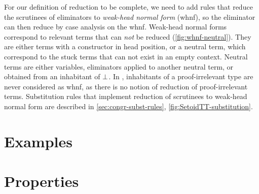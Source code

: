 For our definition of reduction to be complete, we need to add rules that
reduce the scrutinees of eliminators to {\em weak-head normal form} (whnf),
so the eliminator can then reduce by case analysis on the whnf.
%
Weak-head normal forms correspond to relevant terms that can \emph{not} be
reduced (\cref{fig:whnf-neutral}).
%
They are either terms with a constructor in head position, or a neutral term, which
correspond to the stuck terms that can not exist in an empty
context. Neutral terms are either variables, eliminators applied to another neutral
term, or obtained from an inhabitant of \( \bot \).
%
In \SetoidTT, inhabitants of a proof-irrelevant type are never
considered as whnf, as there is no notion of reduction of
proof-irrelevant terms.
%
Substitution rules that implement reduction of scrutinees to weak-head normal
form are described in \cref{sec:congr-subst-rules}, \cref{fig:SetoidTT-substitution}.

\section{Examples}
\label{sec:examples}


\section{Properties}
\label{sec:properties}

